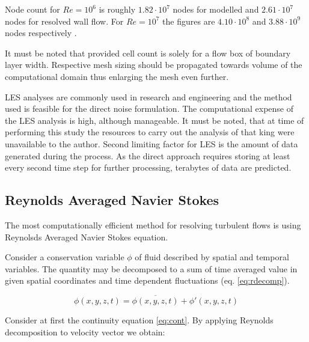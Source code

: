 Node count for $Re = 10^6$ is roughly $1.82 \cdot 10^{7}$ nodes for modelled and $2.61 \cdot 10^{7}$ nodes for resolved wall flow. For $Re = 10^7$ the figures are $4.10 \cdot 10^{8}$ and $3.88 \cdot 10^{9}$ nodes respectively \citep{LES_size}.

It must be noted that provided cell count is solely for a flow box of boundary layer width. Respective mesh sizing should be propagated towards volume of the computational domain thus enlarging the mesh even further.

LES analyses are commonly used in research and engineering and the method used is feasible for the direct noise formulation. The computational expense of the LES analysis is high, although manageable. It must be noted, that at time of performing this study the resources to carry out the analysis of that king were unavailable to the author. Second limiting factor for LES is the amount of data generated during the process. As the direct approach requires storing at least every second time step for further processing, terabytes of data are predicted.

\subsection{Reynolds Averaged Navier Stokes} \label{RANS}
The most computationally efficient method for resolving turbulent flows is using Reynolsds Averaged Navier Stokes equation.

Consider a conservation variable $\phi$ of fluid described by spatial and temporal variables. The quantity may be decomposed to a sum of time averaged value in given spatial coordinates and time dependent fluctuations (eq. \ref{eq:rdecomp}).


\begin{equation} \label{eq:rdecomp}
\phi (x, y, z, t) = \overline{\phi (x, y, z, t)} + \phi ' (x, y, z, t)
\end{equation}

Consider at first the continuity equation \ref{eq:cont}. By applying Reynolds decomposition to velocity vector we obtain:

